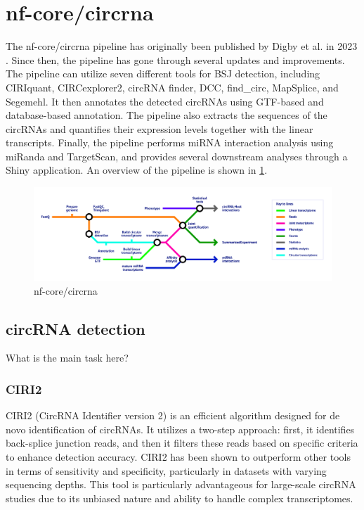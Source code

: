 \section{nf-core/circrna}
\label{sec:nf-core_circrna}
The nf-core/circrna pipeline has originally been published by Digby et al.
in
2023 \supercite{digby_nf-corecircrna_2023}.
Since then, the pipeline has gone through several updates and improvements.
The pipeline can utilize seven different tools for BSJ detection, including
CIRIquant, CIRCexplorer2, circRNA finder, DCC, find\_circ, MapSplice, and
Segemehl.
It then annotates the detected circRNAs using GTF-based and database-based
annotation.
The pipeline also extracts the sequences of the circRNAs and quantifies their
expression levels together with the linear transcripts.
Finally, the pipeline performs miRNA interaction analysis using miRanda and
TargetScan, and provides several downstream analyses through a Shiny
application.
An overview of the pipeline is shown in \cref{fig:circrna_pipeline}.

\begin{figure}[ht]
    \centering

    \includegraphics[width=\textwidth]{chapters/3_materials_and_methods/figures/nf-core_circrna.png}
    \caption{nf-core/circrna} %
    \label{fig:circrna_pipeline}
\end{figure}

\subsection{circRNA detection}
\label{subsec:circrna_detection}
What is the main task here?

\subsubsection{CIRI2}
CIRI2 (CircRNA Identifier version 2) is an efficient algorithm designed for de
novo identification of circRNAs.
It utilizes a two-step approach: first, it identifies back-splice junction
reads, and then it filters these reads based on specific criteria to enhance
detection accuracy.
CIRI2 has been shown to outperform other tools in terms of sensitivity and
specificity, particularly in datasets with varying sequencing
depths\supercite{gao_ciri_2015,zheng_reconstruction_2019}.
This tool is particularly advantageous for large-scale circRNA studies due to
its unbiased nature and ability to handle complex
transcriptomes\supercite{chuang_assessing_2023}.

